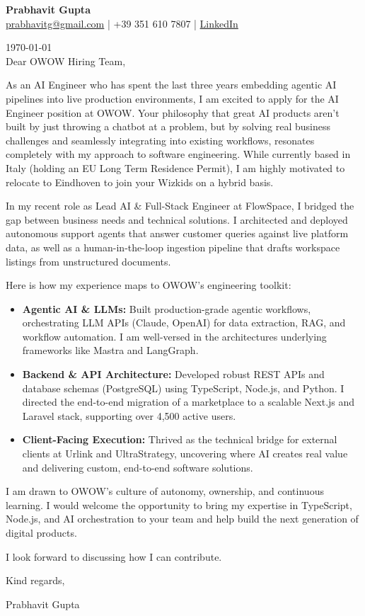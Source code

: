 \documentclass[11pt,a4paper]{article}
\begin{document}
\begin{center}
    {\Huge \textbf{Prabhavit Gupta}} \\ \vspace{0.2cm}
    \href{mailto:prabhavitg@gmail.com}{prabhavitg@gmail.com} | +39 351 610 7807 | \href{https://www.linkedin.com/in/prabhavit/}{LinkedIn}
\end{center}
\vspace{0.5cm}

\today \\

Dear OWOW Hiring Team,

As an AI Engineer who has spent the last three years embedding agentic AI pipelines into live production environments, I am excited to apply for the AI Engineer position at OWOW. Your philosophy that great AI products aren't built by just throwing a chatbot at a problem, but by solving real business challenges and seamlessly integrating into existing workflows, resonates completely with my approach to software engineering. While currently based in Italy (holding an EU Long Term Residence Permit), I am highly motivated to relocate to Eindhoven to join your Wizkids on a hybrid basis.

In my recent role as Lead AI \& Full-Stack Engineer at FlowSpace, I bridged the gap between business needs and technical solutions. I architected and deployed autonomous support agents that answer customer queries against live platform data, as well as a human-in-the-loop ingestion pipeline that drafts workspace listings from unstructured documents. 

Here is how my experience maps to OWOW's engineering toolkit:
\begin{itemize}
    \item \textbf{Agentic AI \& LLMs:} Built production-grade agentic workflows, orchestrating LLM APIs (Claude, OpenAI) for data extraction, RAG, and workflow automation. I am well-versed in the architectures underlying frameworks like Mastra and LangGraph.
    \item \textbf{Backend \& API Architecture:} Developed robust REST APIs and database schemas (PostgreSQL) using TypeScript, Node.js, and Python. I directed the end-to-end migration of a marketplace to a scalable Next.js and Laravel stack, supporting over 4,500 active users.
    \item \textbf{Client-Facing Execution:} Thrived as the technical bridge for external clients at Urlink and UltraStrategy, uncovering where AI creates real value and delivering custom, end-to-end software solutions.
\end{itemize}

I am drawn to OWOW's culture of autonomy, ownership, and continuous learning. I would welcome the opportunity to bring my expertise in TypeScript, Node.js, and AI orchestration to your team and help build the next generation of digital products.

I look forward to discussing how I can contribute.

Kind regards,

Prabhavit Gupta
\end{document}
